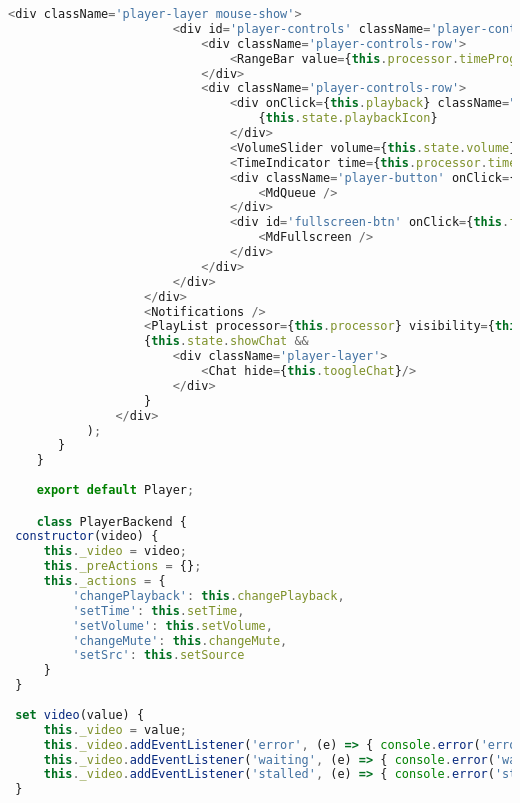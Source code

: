 \begin{lstlisting}[language=JavaScript,label={lst:add:player}]
                   <div className='player-layer mouse-show'>
                       <div id='player-controls' className='player-controls'>
                           <div className='player-controls-row'>
                               <RangeBar value={this.processor.timeProgress} handle_change={this.setTime} style={{ 'margin-top': '5px', 'margin-bottom': '5px' }} />
                           </div>
                           <div className='player-controls-row'>
                               <div onClick={this.playback} className="player-button player-button-play">
                                   {this.state.playbackIcon}
                               </div>
                               <VolumeSlider volume={this.state.volume} volumeHandler={this.setVolume} toggleMute={this.changeMute} />
                               <TimeIndicator time={this.processor.time} duration={this.processor.duration} />
                               <div className='player-button' onClick={this.togglePlaylist}>
                                   <MdQueue />
                               </div>
                               <div id='fullscreen-btn' onClick={this.fullscreen} className="player-button player-button-fullscreen">
                                   <MdFullscreen />
                               </div>
                           </div>
                       </div>
                   </div>
                   <Notifications />
                   <PlayList processor={this.processor} visibility={this.state.playlist} playlistLogic={this.props.playlistLogic} libraryLogic={this.props.libraryLogic} toogleVideoChooser={this.toogleVideoChooser} />
                   {this.state.showChat &&
                       <div className='player-layer'>
                           <Chat hide={this.toogleChat}/>
                       </div>
                   }
               </div>
           );
       }
    }
     
    export default Player;

    class PlayerBackend {
 constructor(video) {
     this._video = video;
     this._preActions = {};
     this._actions = {
         'changePlayback': this.changePlayback,
         'setTime': this.setTime,
         'setVolume': this.setVolume,
         'changeMute': this.changeMute,
         'setSrc': this.setSource
     }
 }
 
 set video(value) {
     this._video = value;
     this._video.addEventListener('error', (e) => { console.error('error', e) });
     this._video.addEventListener('waiting', (e) => { console.error('waiting', e) });
     this._video.addEventListener('stalled', (e) => { console.error('stalled', e) });
 }
 

\end{lstlisting}
